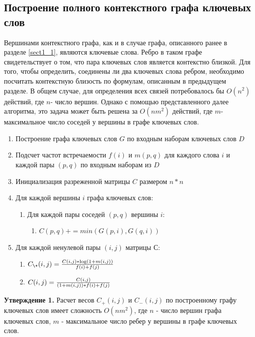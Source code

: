 \subsection{Построение полного контекстного графа ключевых слов}
Вершинами контекстного графа, как и в случае графа, описанного ранее в разделе \ref{sect1_1}, являются ключевые слова. Ребро в таком графе свидетельствует о том, что пара ключевых слов является контекстно близкой. Для того, чтобы определить, соединены ли два ключевых слова ребром, необходимо посчитать контекстную близость по формулам, описанным в предыдущем разделе. В общем случае, для определения всех связей потребовалось бы $O(n^2)$ действий, где $n$- число вершин. Однако с помощью представленного далее алгоритма, это задача может быть решена за $O(nm^2)$ действий, где $m$- максимальное число соседей у вершины в графе ключевых слов.

\begin{enumerate}
    \item Построение графа ключевых слов $G$ по входным наборам ключевых слов $D$
    \item Подсчет частот встречаемости $f(i)$ и $m(p, q)$ для каждого слова $i$ и каждой пары $(p, q)$ по входным наборам из $D$
    \item Инициализация разреженной матрицы $C$ размером $n * n$
    \item Для каждой вершины $i$ графа ключевых слов:
        \begin{enumerate}
            \item Для каждой пары соседей $(p, q)$ вершины $i$:
                \begin{enumerate}
                    \item $C(p, q) \mathrel{{+}{=}} min(G(p,i), G(q,i))$
                \end{enumerate}
        \end{enumerate}
    \item Для каждой ненулевой пары $(i, j)$ матрицы $С$:
        \begin{enumerate}
            \item $C_{\+}(i, j) = \frac{C(i, j) * \log(1 + m(i,j))}{f(i) + f(j)}$
            \item $C_{\-}(i, j) = \frac{C(i, j)}{(1 + m(i,j)) * f(i) + f(j)}$
        \end{enumerate}
\end{enumerate}

\textbf{Утверждение 1.} Расчет весов $C_{+}(i, j)$ и $C_{-}(i, j)$ по построенному графу ключевых слов имеет сложность $O(nm^2)$, где $n$ - число вершин графа ключевых слов, $m$ - максимальное число ребер у вершины в графе ключевых слов.

